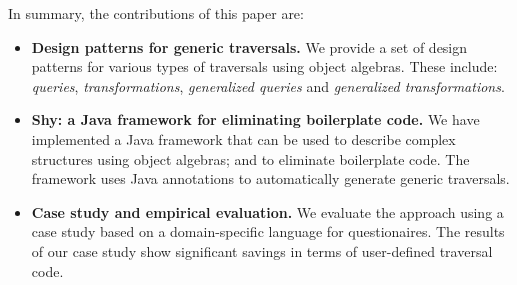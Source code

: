 In summary, the contributions of this paper are:

\begin{itemize}

\item {\bf Design patterns for generic traversals.} We provide a set of design 
patterns for various types of traversals using object algebras. These include: 
\emph{queries}, \emph{transformations},
\emph{generalized queries} and \emph{generalized transformations}.

\item {\bf Shy: a Java framework for eliminating boilerplate code.} We have implemented 
a Java framework that can be used to describe complex structures using 
object algebras; and to eliminate boilerplate code. The framework uses Java 
annotations to automatically generate generic traversals.

\item {\bf Case study and empirical evaluation.} We evaluate the approach using 
a case study based on a domain-specific language for questionaires. The results 
of our case study show significant savings in terms of user-defined traversal code.

\end{itemize}
